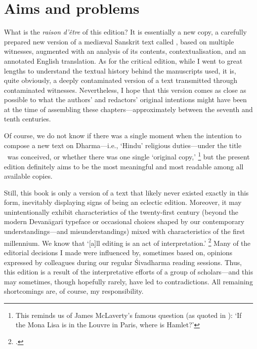 
\section{Aims and problems}
\frenchspacing

\noindent
What is the \textit{raison d'\^etre} of this edition? 
It is essentially a new copy, a carefully prepared new version
of a medi\ae val Sanskrit text called \Vss, based on multiple witnesses,
augmented with an analysis of its contents,
contextualisation, and an annotated English translation.
As for the critical edition, while I went to great 
lengths to understand the textual history behind 
the manuscripts used, it is, quite obviously, a deeply contaminated 
version of a text transmitted through contaminated witnesses.
Nevertheless, I hope that this version comes as 
close as possible to what the authors' and redactors'
original intentions might have been at the time of assembling
these chapters---approximately between the seventh and tenth centuries.

Of course, we do not know if there was a single moment
when the intention to compose a new text on Dharma---i.e., `Hindu' religious duties---under
the title \Vss\ was conceived, or whether there was one single `original copy,'%
		\footnote{This reminds us of James McLaverty's famous question (as quoted in
   				  ):
                 `If the Mona Lisa is in the Louvre in Paris, 	
                 where is Hamlet?'}
but the present edition definitely aims to be the most meaningful and
most readable among all available copies.

Still, this book is only a
version of a text that likely never existed exactly 
in this form, inevitably displaying
signs of being an eclectic edition. 
Moreover, it may unintentionally exhibit 
characteristics of the twenty-first century 
(beyond the modern Devanāgarī typeface or occasional choices\linebreak
shaped by our contemporary understandings---and misunderstandings)\linebreak
mixed with characteristics of the first millennium.
We know that `[a]ll editing is an act of interpretation.'%
		\footnote{.}
Many of the editorial decisions I made were influenced by,
sometimes based on, opinions expressed by colleagues during our
regular Śivadharma reading sessions. Thus, this edition is a result
of the interpretative efforts of a group of scholars---and
this may sometimes, though hopefully rarely, have led to contradictions.
All remaining shortcomings are, of course, my responsibility.

